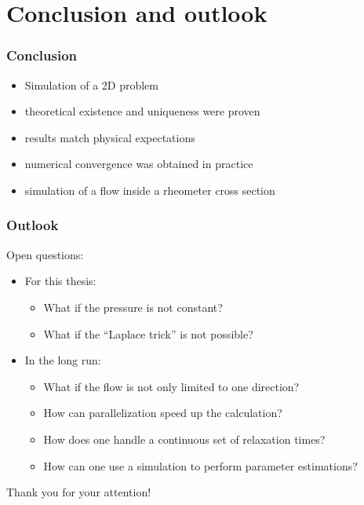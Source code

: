 \documentclass[12pt,a4paper,handout]{beamer}
\theoremstyle{definition}
\theoremstyle{plain}
\begin{document}
\section{Conclusion and outlook}
\begin{frame}
    \frametitle{Conclusion}
    \begin{itemize}[<+->]
        \item Simulation of a 2D problem 
        \item theoretical existence and uniqueness were proven
        \item results match physical expectations
        \item numerical convergence was obtained in practice
        \item simulation of a flow inside a rheometer cross section
    \end{itemize}
\end{frame}
\begin{frame}
    \frametitle{Outlook}
    Open questions:
    \begin{itemize}[<+->]
        \item For this thesis:
        \begin{itemize}[<+->]
            \item What if the pressure is not constant?
             \item What if the \enquote{Laplace trick} is not possible?
        \end{itemize}
       \item In the long run:
       \begin{itemize}[<+->]
          \item What if the flow is not only limited to one direction? 
          \item How can parallelization speed up the calculation? 
          \item How does one handle a continuous set of relaxation times?
          \item How can one use a simulation to perform parameter estimations?
       \end{itemize}
    \end{itemize}
\end{frame}
\begin{frame}
\huge{Thank you for your attention!}
\end{frame}
\end{document}
